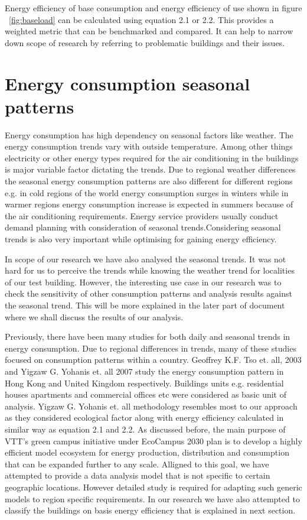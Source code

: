 Energy efficiency of base consumption and energy efficiency of use shown in figure ~\ref{fig:baseload} can be calculated using equation 2.1 or 2.2. This provides a weighted metric that can be benchmarked and compared. It can help to narrow down scope of research by referring to problematic buildings and their issues.

\section{Energy consumption seasonal patterns}
Energy consumption has high dependency on seasonal factors like weather. The energy consumption trends vary with outside temperature. Among other things electricity or other energy types required for the air conditioning in the buildings is major variable factor dictating the trends. Due to regional weather differences the seasonal energy consumption patterns are also different for different regions e.g. in cold regions of the world energy consumption surges in winters while in warmer regions energy consumption increase is expected in summers because of the air conditioning requirements. Energy service providers usually conduct demand planning with consideration of seasonal trends.Considering seasonal trends is also very important while optimising for gaining energy efficiency. 

In scope of our research we have also analysed the seasonal trends. It was not hard for us to perceive the trends while knowing the weather trend for localities of our test building. However, the interesting use case in our research was to check the sensitivity of other consumption patterns and analysis results against the seasonal trend. This will be more explained in the later part of document where we shall discuss the results of our analysis.

Previously, there have been many studies for both daily and seasonal trends in energy consumption. Due to regional differences in trends, many of these studies focused on consumption patterns within a country. Geoffrey K.F. Tso et. all, 2003\cite{tso2003study} and Yigzaw G. Yohanis et. all 2007\cite{yohanis2008real} study the energy consumption pattern in Hong Kong and United Kingdom respectively. Buildings units e.g. residential houses apartments and commercial offices etc were considered as basic unit of analysis. Yigzaw G. Yohanis et. all methodology resembles most to our approach as they considered ecological factor along with energy efficiency calculated in similar way as equation 2.1 and 2.2. As discussed before, the main purpose of VTT's green campus initiative under EcoCampus 2030 plan is to develop a highly efficient model ecosystem for energy production, distribution and consumption that can be expanded further to any scale. Alligned to this goal, we have attempted to provide a data analysis model that is not specific to certain geographic locations. However detailed study is required for adapting such generic models to region specific requirements. In our research we have also attempted to classify the buildings on basis energy efficiency that is explained in next section.

